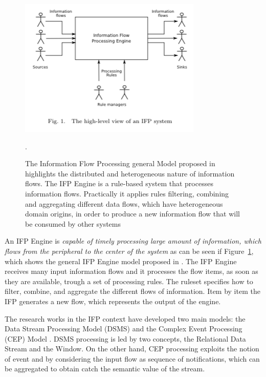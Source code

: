 \begin{figure}[tbh]
  \centering
	\includegraphics[width=0.75\linewidth]{images/ifp}
	\caption[IFP general Model]{The Information Flow Processing general Model proposed in \cite{Cugola:2012:PFI:2187671.2187677} highlights the distributed and heterogeneous nature of information flows. The IFP Engine is a rule-based system that processes information flows. Practically it applies rules filtering, combining and aggregating different data flows, which have  heterogeneous domain origins, in order to produce a new information flow that will be consumed by other systems} .
  	\label{fig:ifp}
\end{figure}

An IFP Engine is \textit{capable of timely processing large amount of information, which flows from the peripheral to the center of the system} as can be seen if Figure~\ref{fig:ifp}, which shows the general IFP Engine model proposed in \cite{Cugola:2012:PFI:2187671.2187677}. The IFP Engine receives many input information flows and it processes the flow items, as soon as they are available, trough a set of processing rules. The ruleset specifies how to filter, combine, and aggregate the different flows of information. Item by item the IFP generates a new flow, which represents the output of the engine.

The research works in the IFP context have developed two main models: the Data Stream Processing Model (DSMS) \cite{Babcock:2002:MID:543613.543615} and the Complex Event Processing (CEP) Model \cite{Luckham:2001:PEI:515781}. 
DSMS processing is led by two concepts, the Relational Data Stream and the Window. On the other hand, CEP processing exploits the notion of event and by considering the input flow as sequence of notifications, which can be aggregated to obtain catch the semantic value of the stream.

